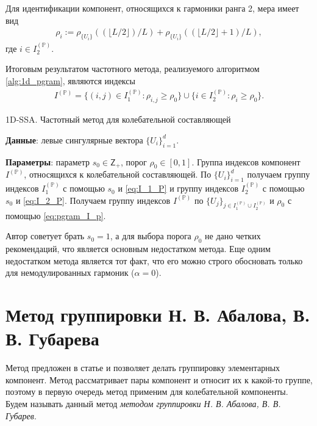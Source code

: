 \documentclass[specialist,
               substylefile = spbu.rtx,
               subf,href,colorlinks=true, 12pt]{disser}
\begin{document}
Для идентификации компонент, относящихся к гармоники ранга 2, мера имеет вид
\begin{gather}\label{eq:rho_i}
\rho_{i} := \rho_{\{U_i\}}((\lfloor L/2 \rfloor)/L) + \rho_{\{U_i\}}((\lfloor L/2 \rfloor + 1)/L),
\end{gather}
где $i \in I_2^{(\mathbb{P})}$.

Итоговым результатом  частотного метода, реализуемого алгоритмом \ref{alg:1d_pgram}, являются индексы 
\begin{gather} \label{eq:pgram_I_p}
I^{(\mathbb{P})} = \{ (i,j) \in I_1^{(\mathbb{P})}: \rho_{i,j} \geqslant\rho_0 \} \cup \{ i \in I_2^{(\mathbb{P})}: \rho_{i} \geqslant\rho_0 \}.
\end{gather}

\begin{algorithm}[!hhh]
\caption{1D-SSA. Частотный метод для колебательной составляющей}
\label{alg:1d_pgram}
\begin{algorithmic}[1]
\REQUIRE 
\item \textbf{Данные}: левые сингулярные вектора $\{U_i\}_{i=1}^{d}$.
\item \textbf{Параметры}: параметр $s_0 \in \mathsf{Z}_{+}$, порог $\rho_0 \in [0,1]$.
\ENSURE Группа индексов компонент $I^{(\mathbb{P})}$, относящихся к колебательной составляющей.
\STATE  По $\{U_i\}_{i=1}^{d}$ получаем группу индексов $I_1^{(\mathbb{P})}$ с помощью $s_0$ и \eqref{eq:I_1_P} и группу индексов $I_2^{(\mathbb{P})}$ с помощью $s_0$ и \eqref{eq:I_2_P}.
\STATE Получаем группу индексов $I^{(\mathbb{P})}$ по $\{U_j\}_{j \in I_1^{(\mathbb{P})} \cup I_2^{(\mathbb{P})}}$ и $\rho_0$ с помощью \eqref{eq:pgram_I_p}.
\end{algorithmic}
\end{algorithm}

Автор \cite{Alexandrov2006} советует брать $s_0 = 1$, а для выбора порога $\rho_0$ не дано четких рекомендаций, что является основным недостатком метода. Еще одним недостатком метода является тот факт, что его можно строго обосновать только для немодулированных гармоник ($\alpha = 0$).

\section{Метод группировки Н. В. Абалова, В. В. Губарева}
Метод предложен в статье \cite{Abalov2015} и позволяет делать группировку элементарных компонент. Метод рассматривает пары компонент и относит их к какой-то группе, поэтому в первую очередь метод применим для колебательной компоненты.    Будем называть данный метод \textit{методом группировки Н. В. Абалова, В. В. Губарев}.
\end{document}
